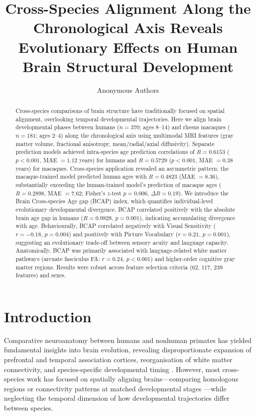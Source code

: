 \documentclass[11pt]{article}
\title{Cross-Species Alignment Along the Chronological Axis Reveals Evolutionary Effects on Human Brain Structural Development}
\author{Anonymous Authors}
\date{}
\begin{document}
\maketitle

\begin{abstract}
Cross-species comparisons of brain structure have traditionally focused on spatial alignment, overlooking temporal developmental trajectories. Here we align brain developmental phases between humans ($n = 370$; ages 8--14) and rhesus macaques ($n = 181$; ages 2--4) along the chronological axis using multimodal MRI features (gray matter volume, fractional anisotropy, mean/radial/axial diffusivity). Separate prediction models achieved intra-species age prediction correlations of $R = 0.6153$ ($p < 0.001$, MAE $= 1.12$ years) for humans and $R = 0.5729$ ($p < 0.001$, MAE $= 0.38$ years) for macaques. Cross-species application revealed an asymmetric pattern: the macaque-trained model predicted human ages with $R = 0.4823$ (MAE $= 8.36$), substantially exceeding the human-trained model's prediction of macaque ages ($R = 0.2898$, MAE $= 7.62$; Fisher's $z$-test $p = 0.006$, $\Delta R = 0.19$). We introduce the Brain Cross-species Age gap (BCAP) index, which quantifies individual-level evolutionary developmental divergence. BCAP correlated positively with the absolute brain age gap in humans ($R = 0.9828$, $p = 0.001$), indicating accumulating divergence with age. Behaviourally, BCAP correlated negatively with Visual Sensitivity ($r = -0.18$, $p = 0.004$) and positively with Picture Vocabulary ($r = 0.21$, $p = 0.001$), suggesting an evolutionary trade-off between sensory acuity and language capacity. Anatomically, BCAP was primarily associated with language-related white matter pathways (arcuate fasciculus FA: $r = 0.24$, $p < 0.001$) and higher-order cognitive gray matter regions. Results were robust across feature selection criteria (62, 117, 239 features) and sexes.
\end{abstract}

\section{Introduction}

Comparative neuroanatomy between humans and nonhuman primates has yielded fundamental insights into brain evolution, revealing disproportionate expansion of prefrontal and temporal association cortices, reorganisation of white matter connectivity, and species-specific developmental timing \citep{rilling2014comparative, hill2010similar, rakic2009evolution}. However, most cross-species work has focused on spatially aligning brains---comparing homologous regions or connectivity patterns at matched developmental stages \citep{mars2018whole, vanessen2019comparative, donahue2018using}---while neglecting the temporal dimension of how developmental trajectories differ between species.
\end{document}
